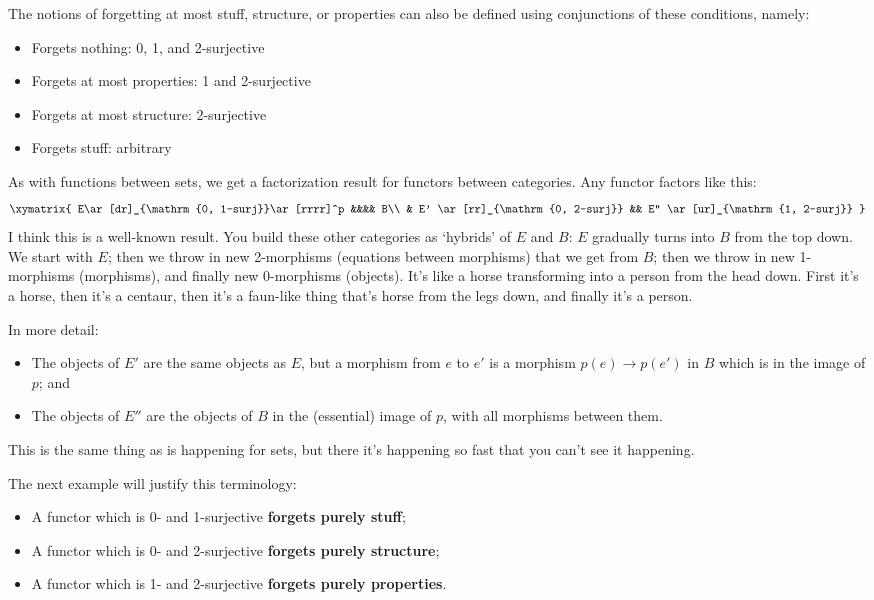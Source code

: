 \documentclass{amsart}
\begin{document}
The notions of forgetting at most stuff, structure,
or properties can also be defined using conjunctions of these
conditions, namely:
\begin{itemize}
\item Forgets nothing: 0, 1, and 2-surjective
\item Forgets at most properties: 1 and 2-surjective
\item Forgets at most structure: 2-surjective
\item Forgets stuff: arbitrary
\end{itemize}

As with functions between sets, we get a factorization result for
functors between categories.  Any functor factors like this:
\[\xymatrix{
E\ar[dr]_{\mathrm{0, 1-surj}}\ar[rrrr]^p &&&& B\\
& E' \ar[rr]_{\mathrm{0, 2-surj}} && E'' \ar[ur]_{\mathrm{1, 2-surj}}
}\]
I think this is a well-known result.
You build these other categories as `hybrids' of $E$ and $B$:
$E$ gradually turns into $B$ from the top down.
We start with $E$; then we throw in new 2-morphisms 
(equations between morphisms) that we get from $B$; then 
we throw in new 1-morphisms (morphisms), and finally 
new 0-morphisms (objects).  It's like a horse transforming into 
a person from the head down.   First it's a
horse, then it's a centaur, then it's a faun-like thing that's horse 
from the legs down, and finally it's a person.

In more detail:
\begin{itemize}
\item The objects of $E'$ are the same objects as $E$, but a morphism
  from $e$ to $e'$ is a morphism $p(e)\to p(e')$ in $B$ which is in
  the image of $p$; and
\item The objects of $E''$ are the objects of $B$ in the (essential)
  image of $p$, with all morphisms between them.
\end{itemize}
This is the same thing as is happening for sets, but there it's
happening so fast that you can't see it happening.

The next example will justify this terminology:

\begin{itemize}
\item A functor which is 0- and 1-surjective \textbf{forgets purely stuff};
\item A functor which is 0- and 2-surjective \textbf{forgets purely structure};
\item A functor which is 1- and 2-surjective \textbf{forgets purely properties}.
\end{itemize}
\end{document}
